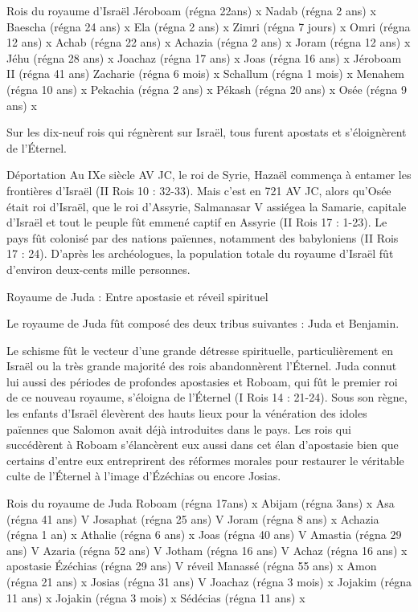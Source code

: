 Rois du royaume d'Israël
Jéroboam (régna 22ans) x
Nadab (régna 2 ans) x
Baescha (régna 24 ans) x
Ela (régna 2 ans) x
Zimri (régna 7 jours) x
Omri (régna 12 ans) x
Achab (régna 22 ans) x
Achazia (régna 2 ans) x
Joram (régna 12 ans) x
Jéhu (régna 28 ans) x
Joachaz (régna 17 ans) x
Joas (régna 16 ans) x
Jéroboam II (régna 41 ans)
Zacharie (régna 6 mois) x
Schallum (régna 1 mois) x
Menahem (régna 10 ans) x
Pekachia (régna 2 ans) x
Pékash (régna 20 ans) x
Osée (régna 9 ans) x

Sur les dix-neuf rois qui régnèrent sur Israël, tous furent apostats et s'éloignèrent de l’Éternel.

Déportation
Au IXe siècle AV JC, le roi de Syrie, Hazaël commença à entamer les frontières d'Israël (II Rois 10 : 32-33).
Mais c'est en 721 AV JC, alors qu'Osée était roi d'Israël, que le roi d'Assyrie, Salmanasar V assiégea la Samarie, capitale d'Israël et tout le peuple fût emmené captif en Assyrie (II Rois 17 : 1-23). Le pays fût colonisé par des nations païennes, notamment des babyloniens (II Rois 17 : 24). D'après les archéologues, la population totale du royaume d'Israël fût d'environ deux-cents mille personnes.

Royaume de Juda : Entre apostasie et réveil spirituel

Le royaume de Juda fût composé des deux tribus suivantes : Juda et Benjamin.

Le schisme fût le vecteur d'une grande détresse spirituelle, particulièrement en Israël ou la très grande majorité des rois abandonnèrent l’Éternel. Juda connut lui aussi des périodes de profondes apostasies et Roboam, qui fût le premier roi de ce nouveau royaume, s'éloigna de l’Éternel (I Rois 14 : 21-24).
Sous son règne, les enfants d'Israël élevèrent des hauts lieux pour la vénération des idoles païennes que Salomon avait déjà introduites dans le pays. Les rois qui succédèrent à Roboam s'élancèrent eux aussi dans cet élan d'apostasie bien que certains d'entre eux entreprirent des réformes morales pour restaurer le véritable culte de l’Éternel à l'image d’Ézéchias ou encore Josias.

Rois du royaume de Juda
Roboam (régna 17ans) x
Abijam (régna 3ans) x
Asa (régna 41 ans) V
Josaphat (régna 25 ans) V
Joram (régna 8 ans) x
Achazia (régna 1 an) x
Athalie (régna 6 ans) x
Joas (régna 40 ans) V
Amastia (régna 29 ans) V
Azaria (régna 52 ans) V
 Jotham (régna 16 ans) V
Achaz (régna 16 ans) x apostasie
Ézéchias (régna 29 ans) V réveil
Manassé (régna 55 ans) x
Amon (régna 21 ans) x
Josias (régna 31 ans) V
Joachaz (régna 3 mois) x
Jojakim (régna 11 ans) x
Jojakin (régna 3 mois) x
Sédécias (régna 11 ans) x

